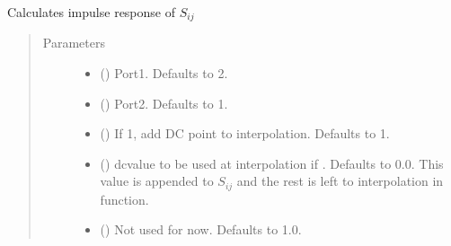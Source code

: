 \documentclass[letterpaper,10pt,english]{sphinxmanual}
\begin{document}
\begin{fulllineitems}
\begin{fulllineitems}
\label{\detokenize{touchstone:touchstone.spfile.ImpulseResponse}}
Calculates impulse response of \(S_{i j}\)
\begin{quote}\begin{description}
\item[{Parameters}] \leavevmode\begin{itemize}
\item {} 
 (\sphinxstyleliteralemphasis{\sphinxupquote{, }}) \textendash{} Port\sphinxhyphen{}1. Defaults to 2.

\item {} 
 (\sphinxstyleliteralemphasis{\sphinxupquote{, }}) \textendash{} Port\sphinxhyphen{}2. Defaults to 1.

\item {} 
 (\sphinxstyleliteralemphasis{\sphinxupquote{, }}) \textendash{} If 1, add DC point to interpolation. Defaults to 1.

\item {} 
 (\sphinxstyleliteralemphasis{\sphinxupquote{, }}) \textendash{} dcvalue to be used at interpolation if . Defaults to 0.0. This value is appended to \(S_{i j}\) and the rest is left to interpolation in  function.

\item {} 
 (\sphinxstyleliteralemphasis{\sphinxupquote{, }}) \textendash{} Not used for now. Defaults to 1.0.


\end{itemize}
\end{description}
\end{quote}
\end{fulllineitems}
\end{fulllineitems}
\end{document}
